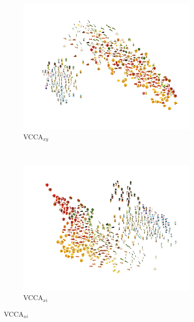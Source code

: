 \begin{figure}[t]
\begin{subfigure}[b]{0.3\textwidth}
     \end{subfigure} 
     \begin{subfigure}[b]{0.3\textwidth}
         \centering
         \includegraphics[width=\textwidth]{PaperB/figures_and_tables/latent_space_visualizations/pca_latents_vcca_xy_seed2.png}
         \caption{VCCA$_{x y}$}
         \label{fig:pca_vcca_xy}
     \end{subfigure} \\
     \begin{subfigure}[b]{0.3\textwidth}
         \centering
         \includegraphics[width=\textwidth]{PaperB/figures_and_tables/latent_space_visualizations/pca_latents_vcca_xi_seed2.png}
         \caption{VCCA$_{x i}$}
         \label{fig:pca_vcca_xi}

\end{subfigure}
\end{figure}

